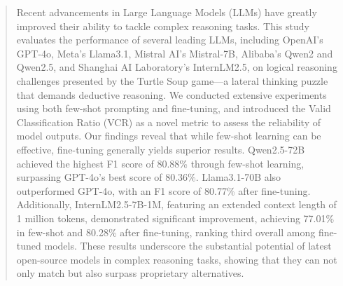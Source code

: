 \documentclass[conference]{IEEEtran}
\begin{document}
\begin{abstract}

Recent advancements in Large Language Models (LLMs) have greatly improved their ability to tackle complex reasoning tasks. This study evaluates the performance of several leading LLMs, including OpenAI’s GPT-4o, Meta’s Llama3.1, Mistral AI's Mistral-7B, Alibaba’s Qwen2 and Qwen2.5, and Shanghai AI Laboratory’s InternLM2.5, on logical reasoning challenges presented by the Turtle Soup game—a lateral thinking puzzle that demands deductive reasoning. We conducted extensive experiments using both few-shot prompting and fine-tuning, and introduced the Valid Classification Ratio (VCR) as a novel metric to assess the reliability of model outputs. Our findings reveal that while few-shot learning can be effective, fine-tuning generally yields superior results. Qwen2.5-72B achieved the highest F1 score of 80.88\% through few-shot learning, surpassing GPT-4o's best score of 80.36\%. Llama3.1-70B also outperformed GPT-4o, with an F1 score of 80.77\% after fine-tuning. Additionally, InternLM2.5-7B-1M, featuring an extended context length of 1 million tokens, demonstrated significant improvement, achieving 77.01\% in few-shot and 80.28\% after fine-tuning, ranking third overall among fine-tuned models. These results underscore the substantial potential of latest open-source models in complex reasoning tasks, showing that they can not only match but also surpass proprietary alternatives.




\end{abstract}
\end{document}

